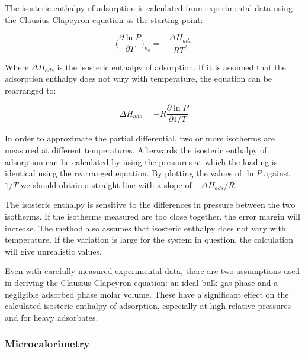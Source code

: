 The isosteric enthalpy of adsorption is calculated from experimental
data using the Clausius-Clapeyron equation as the starting point:

\begin{equation}
    \Big( \frac{\partial \ln P}{\partial T} \Big)_{n_a} = -\frac{\Delta H_{ads}}{R T^2}
\end{equation}

Where \(\Delta H_{ads}\) is the isosteric enthalpy of adsorption.
If it is assumed that the adsorption enthalpy does not vary with 
temperature, the equation can be rearranged to:

\begin{equation}
    \Delta H_{ads} = - R \frac{\partial \ln P}{\partial 1 / T}
\end{equation}

In order to approximate the partial differential, two or more
isotherms are measured at different temperatures. 
Afterwards the isosteric enthalpy of adsorption can be calculated
by using the pressures at which the loading is identical using the 
rearranged equation. By plotting the values of \(\ln P\) against
\(1 / T\) we should obtain a straight line with a slope
of \(- \Delta H_{ads} / R\).

The isosteric enthalpy is sensitive to the differences in pressure between
the two isotherms. If the isotherms measured are too close together, 
the error margin will increase. The method also assumes that isosteric
enthalpy does not vary with temperature. If the
variation is large for the system in question, the calculation will
give unrealistic values.

Even with carefully measured experimental data, there are two 
assumptions used in deriving the Clausius-Clapeyron equation: 
an ideal bulk gas phase and a negligible adsorbed phase
molar volume. These have a significant effect on the calculated 
isosteric enthalpy of adsorption, especially at high relative pressures 
and for heavy adsorbates.

\subsubsection{Microcalorimetry}

